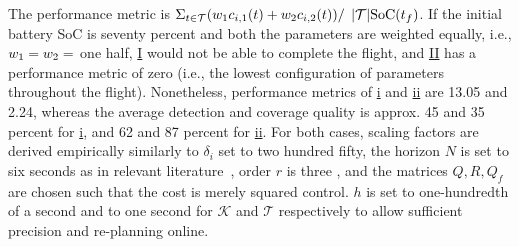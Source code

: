 \documentclass[letterpaper,10pt,conference,twoside]{IEEEtran}
\theoremstyle{definition}
\begin{document}
{\color{black}
The performance metric is $\Sigma_{t\in\mathcal{T}}{\small (w_1c_{i,1}(t)+w_2c_{i,2}(t))}/$ $\small {\small |\mathcal{T}|\text{SoC}(t_f)}$. If the initial battery SoC %
is seventy percent and both the parameters are weighted equally, i.e., ${\small w_1=w_2=}$ one half, \hyperref[fig:trajs-I-static]{I} would not be able to complete the flight, and \hyperref[fig:trajs-II-static]{II} has a performance metric of zero (i.e., the lowest configuration of parameters throughout the flight).
Nonetheless, performance metrics of \hyperref[fig:trajs-dyn-i]{i} and \hyperref[fig:trajs-dyn-ii]{ii} are 13.05 and 2.24, whereas the average detection and coverage quality is approx. 45 and 35 percent for \hyperref[fig:trajs-dyn-i]{i}, and 62 and 87 percent for \hyperref[fig:trajs-dyn-ii]{ii}.}
For both cases, scaling factors are derived empirically %
{\color{black}similarly to $\delta_i$ set to two hundred fifty}, 
the horizon $N$ is set to six seconds {\color{black} as in} relevant literature~\cite{gavilan2015iterative,%
stastny2018nonlinear%
}, order $r$ is three%
, and the matrices $Q,R,Q_f$ are chosen such that the cost is merely 
squared control. {\color{black} $h$ is set to one-hundredth of a second and to one second for $\mathcal{K}$ and $\mathcal{T}$ respectively to allow sufficient precision and re-planning online.}
\end{document}
